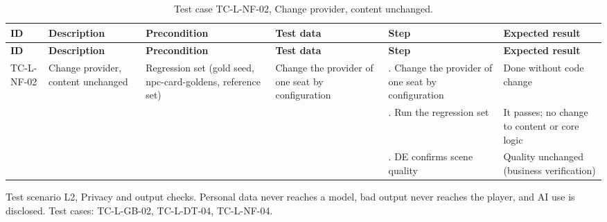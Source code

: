 {\footnotesize{}\renewcommand{\arraystretch}{1.1}
\begin{longtable}{|>{\raggedright\arraybackslash}p{}|>{\raggedright\arraybackslash}p{}|>{\raggedright\arraybackslash}p{}|>{\raggedright\arraybackslash}p{}|>{\raggedright\arraybackslash}p{}|>{\raggedright\arraybackslash}p{}|}
\caption{Test case TC-L-NF-02, Change provider, content unchanged.} \\
\hline
\textbf{ID} & \textbf{Description} & \textbf{Precondition} & \textbf{Test data} & \textbf{Step} & \textbf{Expected result} \\ \hline
\endfirsthead
\hline
\textbf{ID} & \textbf{Description} & \textbf{Precondition} & \textbf{Test data} & \textbf{Step} & \textbf{Expected result} \\ \hline
\endhead
TC-L-NF-02 & Change provider, content unchanged & Regression set (gold seed, npc-\allowbreak{}card-\allowbreak{}goldens, reference set) & Change the provider of one seat by configuration & 1. Change the provider of one seat by configuration & Done without code change \\ \cline{5-6}
 &  &  &  & 2. Run the regression set & It passes; no change to content or core logic \\ \cline{5-6}
 &  &  &  & 3. DE confirms scene quality & Quality unchanged (business verification) \\ \hline
\end{longtable}
}

Test scenario L2, Privacy and output checks. Personal data never reaches a model, bad output never reaches the player, and AI use is disclosed. Test cases: TC-L-GB-02, TC-L-DT-04, TC-L-NF-04.

